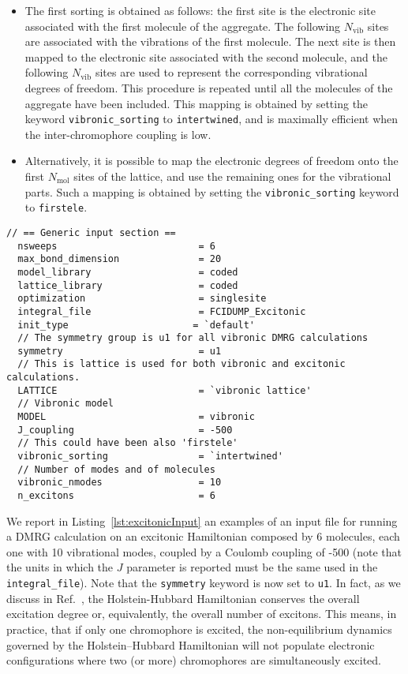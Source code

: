 \documentclass[bibliography=totoc,12pt,a4paper]{scrartcl}
\begin{document}
\begin{itemize}
  \item The first sorting is obtained as follows: the first site is the electronic site associated with the first molecule of the aggregate. The following $N_\text{vib}$ sites are associated with the vibrations of the first molecule. The next site is then mapped to the electronic site associated with the second molecule, and the following $N_\text{vib}$ sites are used to represent the corresponding vibrational degrees of freedom. This procedure is repeated until all the molecules of the aggregate have been included. This mapping is obtained by setting the keyword \texttt{vibronic\_sorting} to \texttt{intertwined}, and is maximally efficient when the inter-chromophore coupling is low.
  \item Alternatively, it is possible to map the electronic degrees of freedom onto the first $N_\text{mol}$ sites of the lattice, and use the remaining ones for the vibrational parts.
  Such a mapping is obtained by setting the \texttt{vibronic\_sorting} keyword to \texttt{firstele}.
\end{itemize}

\begin{lstlisting}[language=qcmaquis,
				   caption={Input example for an excitonic DMRG calculation},
				   label=lst:excitonicInput]
  // == Generic input section ==
  nsweeps                         = 6
  max_bond_dimension              = 20
  model_library                   = coded
  lattice_library                 = coded
  optimization                    = singlesite
  integral_file                   = FCIDUMP_Excitonic
  init_type                      = `default'
  // The symmetry group is u1 for all vibronic DMRG calculations
  symmetry                        = u1
  // This is lattice is used for both vibronic and excitonic calculations.
  LATTICE                         = `vibronic lattice'
  // Vibronic model
  MODEL                           = vibronic
  J_coupling                      = -500
  // This could have been also 'firstele'
  vibronic_sorting                = `intertwined'
  // Number of modes and of molecules
  vibronic_nmodes                 = 10
  n_excitons                      = 6
\end{lstlisting}

We report in Listing~\ref{lst:excitonicInput} an examples of an input file for running a DMRG calculation on an excitonic Hamiltonian composed by 6 molecules, each one with 10 vibrational modes, coupled by a Coulomb coupling of -500 (note that the units in which the $J$ parameter is reported must be the same used in the \texttt{integral\_file}).
Note that the \texttt{symmetry} keyword is now set to \texttt{u1}.
In fact, as we discuss in Ref.~, the Holstein-Hubbard Hamiltonian conserves the overall excitation degree or, equivalently, the overall number of excitons.
This means, in practice, that if only one chromophore is excited, the non-equilibrium dynamics governed by the Holstein--Hubbard Hamiltonian will not populate electronic configurations where two (or more) chromophores are simultaneously excited.
\end{document}
